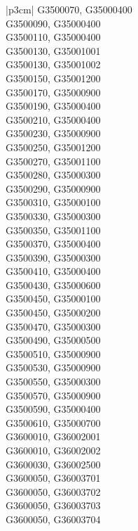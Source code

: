 \begin{customLongTable}{ |p{3cm}| }
G3500070, G35000400 \\ \hline
G3500090, G35000400 \\ \hline
G3500110, G35000400 \\ \hline
G3500130, G35001001 \\ \hline
G3500130, G35001002 \\ \hline
G3500150, G35001200 \\ \hline
G3500170, G35000900 \\ \hline
G3500190, G35000400 \\ \hline
G3500210, G35000400 \\ \hline
G3500230, G35000900 \\ \hline
G3500250, G35001200 \\ \hline
G3500270, G35001100 \\ \hline
G3500280, G35000300 \\ \hline
G3500290, G35000900 \\ \hline
G3500310, G35000100 \\ \hline
G3500330, G35000300 \\ \hline
G3500350, G35001100 \\ \hline
G3500370, G35000400 \\ \hline
G3500390, G35000300 \\ \hline
G3500410, G35000400 \\ \hline
G3500430, G35000600 \\ \hline
G3500450, G35000100 \\ \hline
G3500450, G35000200 \\ \hline
G3500470, G35000300 \\ \hline
G3500490, G35000500 \\ \hline
G3500510, G35000900 \\ \hline
G3500530, G35000900 \\ \hline
G3500550, G35000300 \\ \hline
G3500570, G35000900 \\ \hline
G3500590, G35000400 \\ \hline
G3500610, G35000700 \\ \hline
G3600010, G36002001 \\ \hline
G3600010, G36002002 \\ \hline
G3600030, G36002500 \\ \hline
G3600050, G36003701 \\ \hline
G3600050, G36003702 \\ \hline
G3600050, G36003703 \\ \hline
G3600050, G36003704 \\ \hline

\end{customLongTable}
